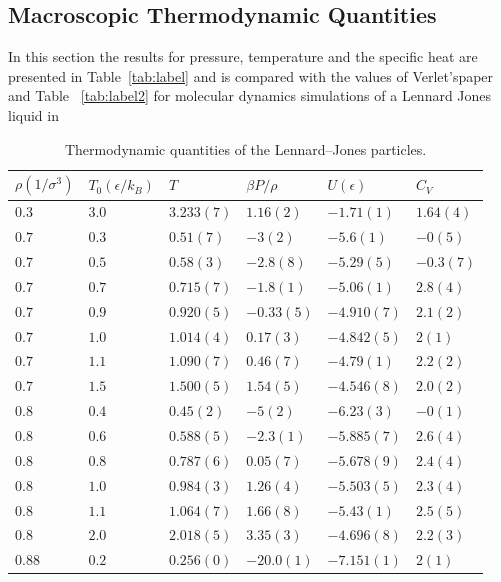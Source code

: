 \documentclass[
10pt, %
a4paper, %
oneside, %
headinclude,footinclude, %
BCOR5mm, %
]{scrartcl}
\begin{document}
\newpage


\subsection{Macroscopic Thermodynamic Quantities}
In this section the results for pressure, temperature and the specific heat are presented in Table~\vref{tab:label} and is compared with the values of Verlet'spaper\cite{Verlet:1967md} and Table ~\vref{tab:label2} for molecular dynamics simulations of a Lennard Jones liquid in \cite{Thijssen:2013cp}


\begin{table}[hbt]
\caption{Thermodynamic quantities of the Lennard–Jones particles.}
\centering
\begin{tabular}{llllll}
\toprule
\toprule
$\rho(1/\sigma^3)$ & $T_0(\epsilon/k_B)$ & $T$ & $\beta P/\rho$ & $U(\epsilon)$ & $C_V$\\
\midrule
$0.3 $ & $3.0$ & $3.233(7) $ & $ 1.16(2)$ & $-1.71(1)$ & $1.64(4)$\\
$0.7 $ & $0.3$ & $0.51(7)$ & $-3(2)$ & $-5.6(1)$ & $-0(5)$\\
$0.7 $ & $0.5$ & $0.58(3)$ & $-2.8(8)$ & $-5.29(5)$ & $-0.3(7)$\\
$0.7 $ & $0.7$ & $0.715(7)$ & $-1.8(1)$ & $-5.06(1)$ & $2.8(4)$\\
$0.7 $ & $0.9$ & $0.920(5)$ & $-0.33(5)$ & $-4.910(7)$ & $2.1(2)$\\
$0.7$ & $1.0$ & $1.014(4)$ & $0.17(3)$ & $-4.842(5)$   & $2(1)$\\
$0.7 $ & $1.1$ & $1.090(7)$ & $ 0.46(7)$ & $-4.79(1)$ & $2.2(2)$\\
$0.7 $ & $1.5$ & $1.500(5)$ & $ 1.54(5)$ & $-4.546(8)$ & $2.0(2)$\\
$0.8 $ & $0.4$ & $0.45(2)$ & $-5(2)$ & $-6.23(3)$ & $-0(1)$\\
$0.8 $ & $0.6$ & $0.588(5)$ & $-2.3(1)$ & $-5.885(7)$ & $2.6(4)$\\
$0.8 $ & $0.8$ & $0.787(6)$ & $ 0.05(7)$ & $-5.678(9)$ & $2.4(4)$\\
$0.8$ & $1.0$ & $0.984(3)$ & $1.26(4)$ & $-5.503(5)$ & $2.3(4)$ \\
$0.8 $ & $1.1$ & $1.064(7)$ & $ 1.66(8)$ & $-5.43(1)$ & $2.5(5)$\\
$0.8 $ & $2.0$ & $2.018(5)$ & $ 3.35(3)$ & $-4.696(8)$ & $2.2(3)$\\
$0.88$ & $0.2$ & $0.256(0)$ & $-20.0(1)$ & $-7.151(1)$ & $2(1)$\\

\end{tabular}
\end{table}
\end{document}
